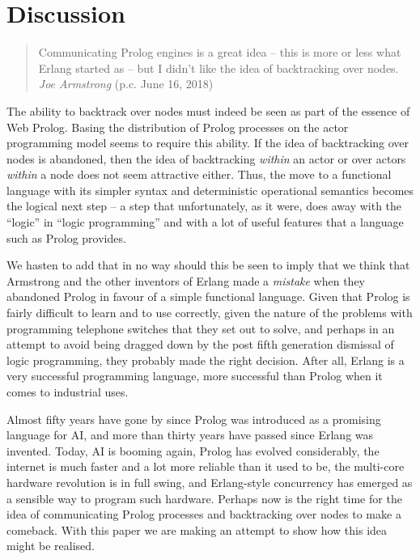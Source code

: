\documentclass{tlp}
\begin{document}
\vspace{-0.05cm}


\section{Discussion}\label{sec:discussion}

\begin{quote}
Communicating Prolog engines is a great idea -- this is more or less what Erlang started as -- but I didn't like the idea of backtracking over nodes. \flushright \textit{Joe Armstrong} (p.c. June 16, 2018)
\end{quote}

\vspace{2mm}

\noindent The ability to backtrack over nodes must indeed be seen as part of the essence of Web Prolog. Basing the distribution of Prolog processes on the actor programming model seems to require this ability. If the idea of backtracking over nodes is abandoned, then the idea of backtracking \textit{within} an actor or over actors \textit{within} a node does not seem attractive either. Thus, the move to a functional language with its simpler syntax and deterministic operational semantics becomes the logical next step -- a step that unfortunately, as it were, does away with the ``logic'' in ``logic programming'' and with a lot of useful features that a language such as Prolog provides.

We hasten to add that in no way should this be seen to imply that we think that Armstrong and the other inventors of Erlang made a \emph{mistake} when they abandoned Prolog in favour of a simple functional language. Given that Prolog is fairly difficult to learn and to use correctly, given the nature of the problems with programming telephone switches that they set out to solve, and perhaps in an attempt to avoid being dragged down by the post fifth generation dismissal of logic programming, they probably made the right decision. After all, Erlang is a very successful programming language, more successful than Prolog when it comes to industrial uses.

Almost fifty years have gone by since Prolog was introduced as a promising language for AI, and more than thirty years have passed since Erlang was invented. Today, AI is booming again, Prolog has evolved considerably, the internet is much faster and a lot more reliable than it used to be, the multi-core hardware revolution is in full swing, and Erlang-style concurrency has emerged as a sensible way to program such hardware. Perhaps now is the right time for the idea of communicating Prolog processes and backtracking over nodes to make a comeback. With this paper we are making an attempt to show how this idea might be realised.
\end{document}
